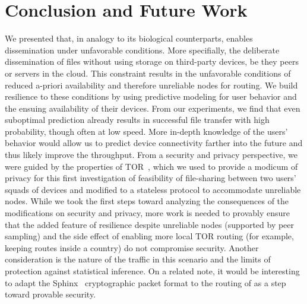 \section{Conclusion and Future Work}%
\label{conclusion}

We presented \name that, in analogy to its biological
counterparts, enables dissemination under unfavorable conditions. More
specifially, the deliberate dissemination of files without using
storage on third-party devices, be they peers or servers in the
cloud. This constraint results in the unfavorable conditions of
reduced a-priori availability and therefore unreliable nodes for
routing. We build resilience to these conditions by using predictive
modeling for user behavior and the ensuing availability of their
devices. From our experiments, we find that even suboptimal prediction
already results in successful file transfer with high probability,
though often at low speed. More in-depth knowledge of the users'
behavior would allow us to predict device connectivity farther into
the future and thus likely improve the throughput. From a security and
privacy perspective, we were guided by the properties of
TOR~\cite{Tor}, which we used to provide a modicum of privacy for this
first investigation of feasibility of file-sharing between two users'
squads of devices and modified to a stateless protocol to
accommodate unreliable nodes. While we took the first steps toward
analyzing the consequences of the modifications on security and
privacy, more work is needed to provably ensure that the added feature
of resilience despite unreliable nodes (supported by peer sampling)
and the side effect of enabling more local TOR routing (for example,
keeping routes inside a country) do not compromise security. Another
consideration is the nature of the traffic in this scenario and the
limits of protection against statistical inference. On a
related note, it would be interesting to adapt the
Sphinx~\cite{Sphinx} cryptographic packet format to the routing of
\name as a step toward provable security.

